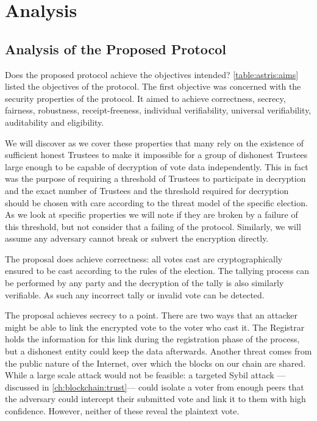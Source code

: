 
\chapter{Analysis}
\label{ch:analysis}

\section{Analysis of the Proposed Protocol}
\label{ch:analysis:analysis}

Does the proposed protocol achieve the objectives intended? \autoref{table:astris:aims} listed the objectives of the protocol. The first objective was concerned with the security properties of the protocol. It aimed to achieve correctness, secrecy, fairness, robustness, receipt-freeness, individual verifiability, universal verifiability, auditability and eligibility.

We will discover as we cover these properties that many rely on the existence of sufficient honest Trustees to make it impossible for a group of dishonest Trustees large enough to be capable of decryption of vote data independently. This in fact was the purpose of requiring a threshold of Trustees to participate in decryption and the exact number of Trustees and the threshold required for decryption should be chosen with care according to the threat model of the specific election. As we look at specific properties we will note if they are broken by a failure of this threshold, but not consider that a failing of the protocol. Similarly, we will assume any adversary cannot break or subvert the encryption directly.

The proposal does achieve correctness: all votes cast are cryptographically ensured to be cast according to the rules of the election. The tallying process can be performed by any party and the decryption of the tally is also similarly verifiable. As such any incorrect tally or invalid vote can be detected.

The proposal achieves secrecy to a point. There are two ways that an attacker might be able to link the encrypted vote to the voter who cast it. The Registrar holds the information for this link during the registration phase of the process, but a dishonest entity could keep the data afterwards. Another threat comes from the public nature of the Internet, over which the blocks on our chain are shared. While a large scale attack would not be feasible: a targeted Sybil attack ---discussed in \autoref{ch:blockchain:trust}--- could isolate a voter from enough peers that the adversary could intercept their submitted vote and link it to them with high confidence. However, neither of these reveal the plaintext vote.

